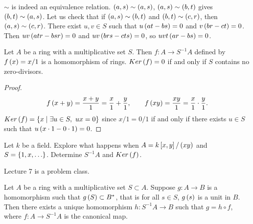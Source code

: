 \begin{remark}
$ \sim $ is indeed an equivalence relation. $ \left( a, s \right) \sim \left( a, s \right) $, $ \left( a, s \right) \sim \left( b, t \right) $ gives $ \left( b, t \right) \sim \left( a, s \right) $. Let us check that if $ \left( a, s \right) \sim \left( b, t \right) $ and $ \left( b, t \right) \sim \left( c, r \right) $, then $ \left( a, s \right) \sim \left( c, r \right) $. There exist $ u, v \in S $ such that $ u\left( at - bs \right) = 0 $ and $ v\left( br - ct \right) = 0 $. Then $ uv\left( atr - bsr \right) = 0 $ and $ uv\left( brs - cts \right) = 0 $, so $ uvt\left( ar - bs \right) = 0 $.
\end{remark}

\begin{lemma}
Let $ A $ be a ring with a multiplicative set $ S $. Then $ f : A \to S^{-1}A $ defined by $ f\left( x \right) = x / 1 $ is a homomorphism of rings. $ Ker\left( f \right) = 0 $ if and only if $ S $ contains no zero-divisors.
\end{lemma}

\begin{proof}
$$ f\left( x + y \right) = \dfrac{x + y}{1} = \dfrac{x}{1} + \dfrac{y}{1}, \qquad f\left( xy \right) = \dfrac{xy}{1} = \dfrac{x}{1} \cdot \dfrac{y}{1}. $$
$ Ker\left( f \right) = \left\{ x \mid \exists u \in S, \ ux = 0 \right\} $ since $ x / 1 = 0 / 1 $ if and only if there exists $ u \in S $ such that $ u\left( x \cdot 1 - 0 \cdot 1 \right) = 0 $.
\end{proof}

\begin{example*}
Let $ k $ be a field. Explore what happens when $ A = k\left[ x, y \right] / \left( xy \right) $ and $ S = \cb{1, x, \dots} $. Determine $ S^{-1}A $ and $ Ker\left( f \right) $.
\end{example*}


Lecture 7 is a problem class.


\begin{lemma}
Let $ A $ be a ring with a multiplicative set $ S \subset A $. Suppose $ g : A \to B $ is a homomorphism such that $ g\left( S \right) \subset B^* $, that is for all $ s \in S $, $ g\left( s \right) $ is a unit in $ B $. Then there exists a unique homomorphism $ h : S^{-1}A \to B $ such that $ g = h \circ f $, where $ f : A \to S^{-1}A $ is the canonical map.
\end{lemma}

